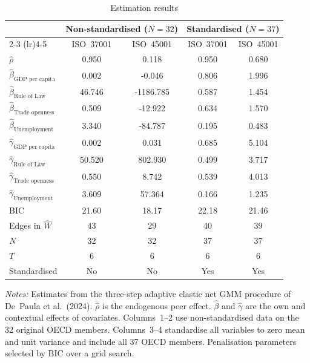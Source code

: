 \documentclass{article}
\begin{document}
\pagestyle{empty}
\begin{table}[htbp]
\centering
\caption{Estimation results}
\label{tab:estimation}
\begin{tabular}{lcccc}
\hline\hline
 & \multicolumn{2}{c}{Non-standardised ($N=32$)} & \multicolumn{2}{c}{Standardised ($N=37$)} \\
\cmidrule(lr){2-3} \cmidrule(lr){4-5}
 & ISO~37001 & ISO~45001 & ISO~37001 & ISO~45001 \\
\hline
$\hat{\rho}$ & 0.950 & 0.118 & 0.950 & 0.680 \\
$\hat{\beta}_{\text{GDP per capita}}$ & 0.002 & -0.046 & 0.806 & 1.996 \\
$\hat{\beta}_{\text{Rule of Law}}$ & 46.746 & -1186.785 & 0.587 & 1.454 \\
$\hat{\beta}_{\text{Trade openness}}$ & 0.509 & -12.922 & 0.634 & 1.570 \\
$\hat{\beta}_{\text{Unemployment}}$ & 3.340 & -84.787 & 0.195 & 0.483 \\
$\hat{\gamma}_{\text{GDP per capita}}$ & 0.002 & 0.031 & 0.685 & 5.104 \\
$\hat{\gamma}_{\text{Rule of Law}}$ & 50.520 & 802.930 & 0.499 & 3.717 \\
$\hat{\gamma}_{\text{Trade openness}}$ & 0.550 & 8.742 & 0.539 & 4.013 \\
$\hat{\gamma}_{\text{Unemployment}}$ & 3.609 & 57.364 & 0.166 & 1.235 \\
\hline
BIC & 21.60 & 18.17 & 22.18 & 21.46 \\
Edges in $\hat{W}$ & 43 & 29 & 40 & 39 \\
$N$ & 32 & 32 & 37 & 37 \\
$T$ & 6 & 6 & 6 & 6 \\
Standardised & No & No & Yes & Yes \\
\hline\hline
\end{tabular}
\begin{minipage}{0.95\textwidth}
\vspace{4pt}
\footnotesize \textit{Notes:} Estimates from the three-step adaptive elastic net GMM procedure of De~Paula et al.\ (2024). $\hat{\rho}$ is the endogenous peer effect. $\hat{\beta}$ and $\hat{\gamma}$ are the own and contextual effects of covariates. Columns~1--2 use non-standardised data on the 32 original OECD members. Columns~3--4 standardise all variables to zero mean and unit variance and include all 37 OECD members. Penalisation parameters selected by BIC over a grid search.
\end{minipage}
\end{table}
\end{document}
